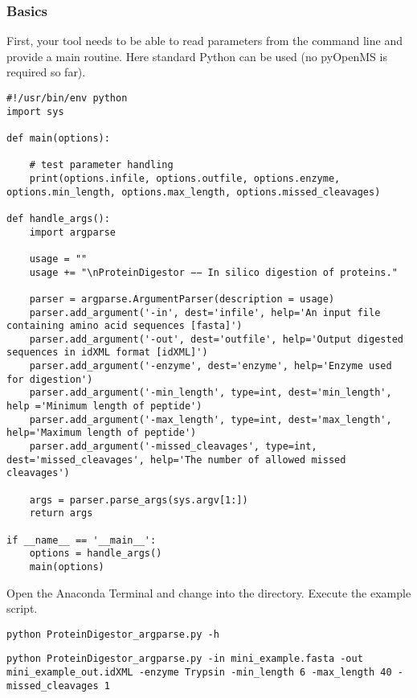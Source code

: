 {\subsubsection{Basics}
First, your tool needs to be able to read parameters from the command line and provide a main routine. Here standard Python can be used (no pyOpenMS is required so far).

\begin{code}
\begin{verbatim}
#!/usr/bin/env python
import sys

def main(options):

    # test parameter handling
    print(options.infile, options.outfile, options.enzyme, options.min_length, options.max_length, options.missed_cleavages)

def handle_args():
    import argparse

    usage = ""
    usage += "\nProteinDigestor −− In silico digestion of proteins."

    parser = argparse.ArgumentParser(description = usage)
    parser.add_argument('-in', dest='infile', help='An input file containing amino acid sequences [fasta]')
    parser.add_argument('-out', dest='outfile', help='Output digested sequences in idXML format [idXML]')
    parser.add_argument('-enzyme', dest='enzyme', help='Enzyme used for digestion')
    parser.add_argument('-min_length', type=int, dest='min_length', help ='Minimum length of peptide')
    parser.add_argument('-max_length', type=int, dest='max_length', help='Maximum length of peptide')
    parser.add_argument('-missed_cleavages', type=int, dest='missed_cleavages', help='The number of allowed missed cleavages')

    args = parser.parse_args(sys.argv[1:])
    return args

if __name__ == '__main__':
    options = handle_args()
    main(options)
\end{verbatim}
\end{code}

\noindent Open the Anaconda Terminal and change into the  directory. Execute the example script. 
\begin{code}
\begin{verbatim}
python ProteinDigestor_argparse.py -h
\end{verbatim}
\end{code}

\begin{code}
\begin{verbatim}
python ProteinDigestor_argparse.py -in mini_example.fasta -out mini_example_out.idXML -enzyme Trypsin -min_length 6 -max_length 40 -missed_cleavages 1
\end{verbatim}
\end{code}

}
